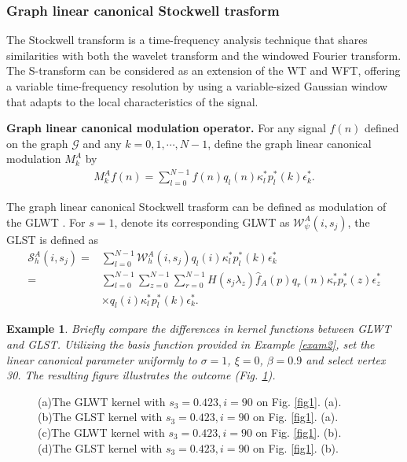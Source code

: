 \documentclass[lettersize,journal]{IEEEtran}
\newtheorem{example}{Example}
\begin{document}
\subsubsection{Graph linear canonical Stockwell trasform}
The Stockwell transform is a time-frequency analysis technique that shares similarities with both the wavelet transform and the windowed Fourier transform. The S-transform can be considered as an extension of the WT and WFT, offering a variable time-frequency resolution by using a variable-sized Gaussian window that adapts to the local characteristics of the signal.

\textbf{Graph linear canonical modulation operator.}
For any signal $f(n)$ defined on the graph $\mathcal{G}$ and any $k=0,1,\cdots,N-1$, define the graph linear canonical modulation $M_k^A$ by
\begin{align}
	M_k^Af(n)=\sum_{l=0}^{N-1} f(n)
	q_l(n) \kappa_l^{*} p_l^*(k) \epsilon_k^{*}.
\end{align}

The graph linear canonical Stockwell trasform can be defined as modulation of the GLWT \cite{stockwell1996localization}. For $s=1$, denote its corresponding GLWT as $\mathcal{W}_{\psi}^A(i,s_j)$, the GLST is defined as
\begin{align}
	\mathcal{S}_h^A(i,s_j)
	=& \sum_{l=0}^{N-1} \mathcal{W}_{h}^A(i,s_j)
	q_l(i) \kappa_l^{*} p_l^*(k) \epsilon_k^{*} \nonumber \\
	=& \sum_{l=0}^{N-1}
	\sum_{z=0}^{N-1} \sum_{r=0}^{N-1} H(s_j\lambda_z)\hat{f}_A(p) 
	q_r(n) \kappa_r^{*} p_r^*(z) \epsilon_z^{*} \nonumber \\
	& \times q_l(i) \kappa_l^{*} p_l^*(k) \epsilon_k^{*}.
\end{align}

\begin{example}
	Briefly compare the differences in kernel functions between GLWT and GLST. Utilizing the basis function provided in Example \ref{exam2}, set the linear canonical parameter uniformly to $\sigma=1$, $\xi=0$, $\beta=0.9$ and select vertex 30. The resulting figure illustrates the outcome (Fig. \ref{fig5}).
\end{example}

\begin{figure}
	\centering
	\quad
	\caption{(a)The GLWT kernel with $s_3=0.423, i=90$ on Fig. \ref{fig1}. (a). (b)The GLST kernel with $s_3=0.423, i=90$ on Fig. \ref{fig1}. (a). (c)The GLWT kernel with $s_3=0.423, i=90$ on Fig. \ref{fig1}. (b). (d)The GLST kernel with $s_3=0.423, i=90$ on Fig. \ref{fig1}. (b). }\label{fig5}
\end{figure}
\end{document}
